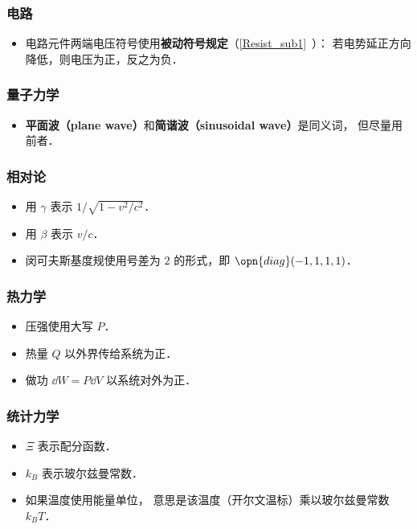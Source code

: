 \subsubsection{电路}
\begin{itemize}
\item 电路元件两端电压符号使用\textbf{被动符号规定}（\autoref{Resist_sub1}~）： 若电势延正方向降低，则电压为正，反之为负．
\end{itemize}

\subsubsection{量子力学}
\begin{itemize}
\item \textbf{平面波（plane wave）}和\textbf{简谐波（sinusoidal wave）}是同义词， 但尽量用前者．
\end{itemize}

\subsubsection{相对论}
\begin{itemize}
\item 用 $\gamma$ 表示 $1/\sqrt{1 - v^2/c^2}$．
\item 用 $\beta$ 表示 $v/c$．
\item 闵可夫斯基度规使用号差为 $2$ 的形式，即 $\opn{diag}(-1, 1, 1, 1)$．
\end{itemize}

\subsubsection{热力学}
\begin{itemize}
\item 压强使用大写 $P$．
\item 热量 $Q$ 以外界传给系统为正．
\item 做功 $\dd{W} = P\dd{V}$ 以系统对外为正．
\end{itemize}

\subsubsection{统计力学}
\begin{itemize}
\item $\Xi$ 表示配分函数．
\item $k_B$ 表示玻尔兹曼常数．
\item 如果温度使用能量单位， 意思是该温度（开尔文温标）乘以玻尔兹曼常数 $k_B T$．
\end{itemize}
